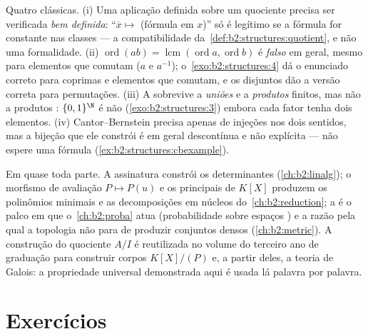 \begin{remark}\label{rem:b2:structures:pitfalls}
Quatro clássicas. (i) Uma aplicação definida sobre um quociente precisa ser
verificada \emph{bem definida}: ``$\overline x \mapsto$ (fórmula em $x$)''
só é legítimo se a fórmula for constante nas classes ---
a compatibilidade da~\cref{def:b2:structures:quotient}, e não uma
formalidade. (ii) $\operatorname{ord}(ab) =
\operatorname{lcm}(\operatorname{ord}a, \operatorname{ord}b)$
é \emph{falso} em geral, mesmo para elementos que comutam ($a$
e $a^{-1}$); o~\cref{exo:b2:structures:4} dá o enunciado correto para
 coprimas e elementos que comutam, e os  disjuntos dão a
versão correta para permutações. (iii) A  sobrevive a
\emph{uniões}  e a \emph{produtos} finitos, mas não a
produtos : $\{0,1\}^{\N}$ é não 
(\cref{exo:b2:structures:3}) embora cada fator tenha dois
elementos. (iv) Cantor--Bernstein precisa apenas de injeções nos dois
sentidos, mas a bijeção que ele constrói é em geral descontínua e
não explícita --- não espere uma fórmula
(\cref{ex:b2:structures:cbexample}).
\end{remark}

\begin{remark}
Em quase toda parte. A assinatura constrói os determinantes
(\cref{ch:b2:linalg}); o morfismo de avaliação $P \mapsto P(u)$
e os  principais de $K[X]$ produzem os polinômios minimais e
as decomposições em núcleos do~\cref{ch:b2:reduction}; a 
é o palco em que o~\cref{ch:b2:proba} atua (probabilidade sobre espaços
) e a razão pela qual a topologia não para de produzir conjuntos
densos  (\cref{ch:b2:metric}). A construção do quociente $A/I$
é reutilizada no volume do terceiro ano de graduação para construir corpos $K[X]/(P)$ e,
a partir deles, a teoria de Galois: a propriedade universal demonstrada aqui é
usada lá palavra por palavra.
\end{remark}

\section{Exercícios}

